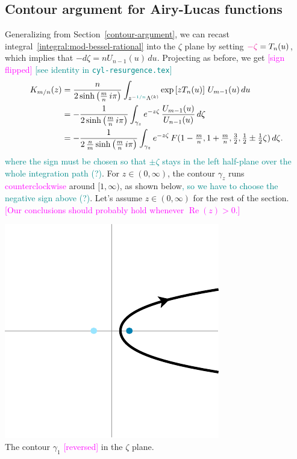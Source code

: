 \documentclass{article}
\theoremstyle{plain}
\begin{document}
\subsection{Contour argument for Airy-Lucas functions}
Generalizing from Section~\ref{contour-argument}, we can recast integral~\ref{integral:mod-bessel-rational} into the $\zeta$ plane by setting $\textcolor{magenta}{-\zeta} = T_n(u)$, which implies that $-d\zeta = n U_{n-1}(u)\,du$. Projecting as before, we get \textcolor{magenta}{[sign flipped]} \textcolor{DarkCyan}{[see identity in \texttt{cyl-resurgence.tex}]}
\begin{align*}%
K_{m/n}(z) & = \frac{n}{2 \sinh\big(\tfrac{m}{n}\,i\pi\big)} \int_{z^{-\textcolor{DarkCyan}{1/n}}\Lambda^{(k)}} \exp\left[z T_n(u)\right]\,U_{m-1}(u)\,du \\
& = -\frac{1}{2 \sinh\big(\tfrac{m}{n}\,i\pi\big)} \int_{\gamma_z} e^{-z\zeta}\,\frac{U_{m-1}(u)}{U_{n-1}(u)}\,d\zeta \\
& = -\frac{1}{2\,\tfrac{n}{m} \sinh\big(\tfrac{m}{n}\,i\pi\big)} \int_{\gamma_z} e^{-z\zeta}\,F(1 - \tfrac{m}{n}, 1 + \tfrac{m}{n}, \tfrac{3}{2}, \tfrac{1}{2} \pm \tfrac{1}{2}\zeta)\,d\zeta.
\end{align*}
\textcolor{DarkCyan}{where the sign must be chosen so that $\pm\zeta$ stays in the left half-plane over the whole integration path (?)}.
For $z \in (0, \infty)$, the contour $\gamma_z$ runs \textcolor{magenta}{counterclockwise} around $[1, \infty)$, as shown below\textcolor{DarkCyan}{, so we have to choose the negative sign above (?)}. Let's assume $z \in (0, \infty)$ for the rest of the section. \textcolor{magenta}{[Our conclusions should probably hold whenever $\operatorname{Re}(z) > 0$.]}
\begin{center}
\includegraphics{figures/zeta_contour_3.pdf} \\[1em]
{\small The contour $\gamma_1$ \textcolor{magenta}{[reversed]} in the $\zeta$ plane.}
\end{center}
\end{document}

